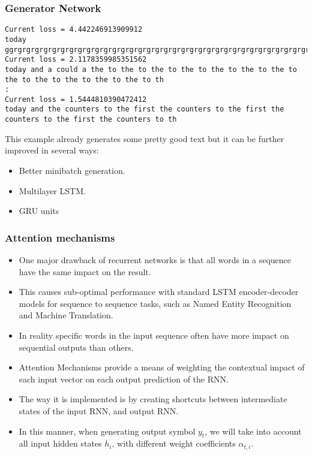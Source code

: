\begin{frame}[fragile] \frametitle{Generator Network}
\begin{lstlisting}
Current loss = 4.442246913909912
today ggrgrgrgrgrgrgrgrgrgrgrgrgrgrgrgrgrgrgrgrgrgrgrgrgrgrgrgrgrgrgrgrgrgrgrgrgrgrgrgrgrgrgrgrgrgrgrgrgrg
Current loss = 2.1178359985351562
today and a could a the to the to the to the to the to the to the to the to the to the to the to the to th
:
Current loss = 1.5444810390472412
today and the counters to the first the counters to the first the counters to the first the counters to th
\end{lstlisting}

This example already generates some pretty good text but it can be further improved in several ways:

\begin{itemize}
\item Better minibatch generation.
\item Multilayer LSTM.
\item GRU units
\end{itemize}
\end{frame}

\begin{frame}[fragile] \frametitle{Attention mechanisms}


\begin{itemize}
\item One major drawback of recurrent networks is that all words in a sequence have the same impact on the result. 
\item This causes sub-optimal performance with standard LSTM encoder-decoder models for sequence to sequence tasks, such as Named Entity Recognition and Machine Translation. 
\item In reality specific words in the input sequence often have more impact on sequential outputs than others.
\item Attention Mechanisms provide a means of weighting the contextual impact of each input vector on each output prediction of the RNN. 
\item The way it is implemented is by creating shortcuts between intermediate states of the input RNN, and output RNN. 
\item In this manner, when generating output symbol $y_t$, we will take into account all input hidden states $h_i$, with different weight coefficients $\alpha_{t,i}$. 

\end{itemize}
\end{frame}

